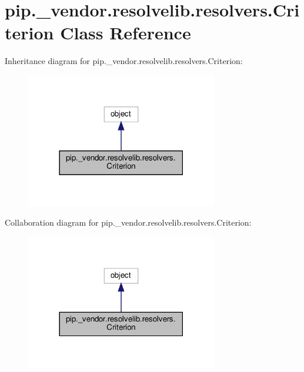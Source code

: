\hypertarget{classpip_1_1__vendor_1_1resolvelib_1_1resolvers_1_1Criterion}{}\section{pip.\+\_\+vendor.\+resolvelib.\+resolvers.\+Criterion Class Reference}
\label{classpip_1_1__vendor_1_1resolvelib_1_1resolvers_1_1Criterion}


Inheritance diagram for pip.\+\_\+vendor.\+resolvelib.\+resolvers.\+Criterion\+:
\nopagebreak
\begin{figure}[H]
\begin{center}
\leavevmode
\includegraphics[width=237pt]{classpip_1_1__vendor_1_1resolvelib_1_1resolvers_1_1Criterion__inherit__graph}
\end{center}
\end{figure}


Collaboration diagram for pip.\+\_\+vendor.\+resolvelib.\+resolvers.\+Criterion\+:
\nopagebreak
\begin{figure}[H]
\begin{center}
\leavevmode
\includegraphics[width=237pt]{classpip_1_1__vendor_1_1resolvelib_1_1resolvers_1_1Criterion__coll__graph}
\end{center}
\end{figure}
